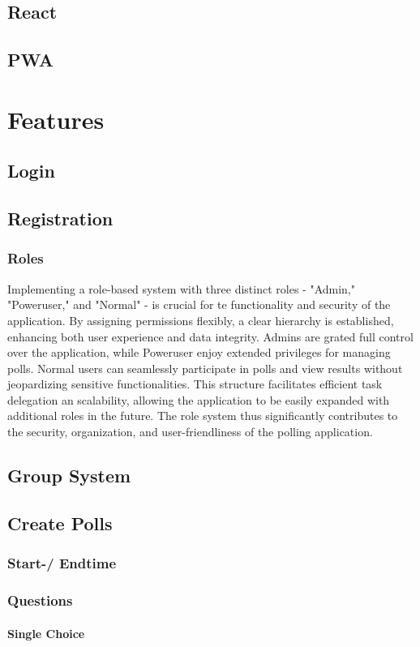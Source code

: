\documentclass[a4paper,12pt]{report}
\begin{document}
\section{React}
\section{PWA}
\chapter{Features}
\section{Login}
\section{Registration}
\subsection{Roles}
Implementing a role-based system with three distinct roles - "Admin," "Poweruser," and "Normal" - is crucial for te functionality and security of the application. By assigning permissions flexibly, a clear hierarchy is established, enhancing both user experience and data integrity. Admins are grated full control over the application, while Poweruser enjoy extended privileges for managing polls. Normal users can seamlessly participate in polls and view results without jeopardizing sensitive functionalities. This structure facilitates efficient task delegation an scalability, allowing the application to be easily expanded with additional roles  in the future. The role system thus significantly contributes to the security, organization, and user-friendliness of the polling application.
\section{Group System}
\section{Create Polls}
\subsection{Start-/ Endtime}
\subsection{Questions}
\subsubsection{Single Choice}
\end{document}
